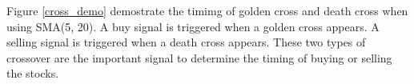 \documentclass[../main.tex]{subfiles}
\begin{document}


Figure \ref{cross_demo} demostrate the timimg of golden cross and death cross when using SMA(5, 20). A buy signal is triggered when a golden cross appears. A selling signal is triggered when a death cross appears. These two types of crossover are the important signal to determine the timing of buying or selling the stocks.
\end{document}
